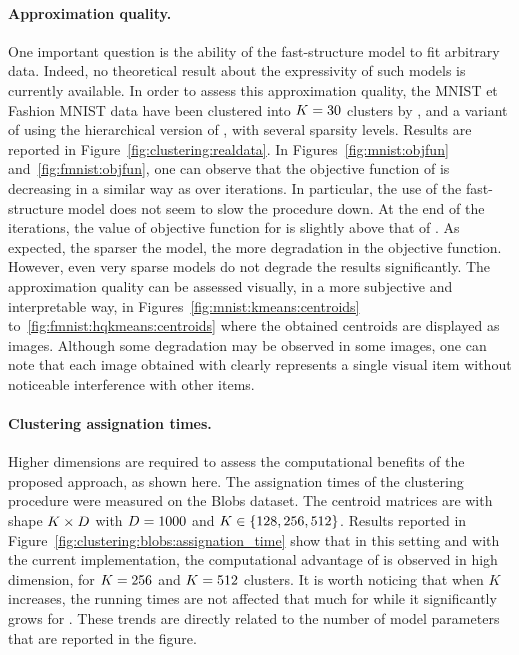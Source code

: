 \paragraph{Approximation quality.} One important question is the ability of the fast-structure model to fit arbitrary data.
Indeed, no theoretical result about the expressivity of such models is currently available.
In order to assess this approximation quality, the MNIST et Fashion MNIST data have been clustered into $K=30$ clusters by \kmeans, \qkmeans and a variant of \qkmeans using the hierarchical version of \palm, with several sparsity levels.
Results are reported in Figure~\ref{fig:clustering:realdata}.
In Figures~\ref{fig:mnist:objfun} and~\ref{fig:fmnist:objfun}, one can observe that the objective function of \qkmeans is decreasing in a similar way as \kmeans over iterations.
In particular, the use of the fast-structure model does not seem to slow the procedure down.
At the end of the iterations, the value of objective function for \qkmeans is slightly above that of \kmeans.
As expected, the sparser the model, the more degradation in the objective function.
However, even very sparse models do not degrade the results significantly.
The approximation quality can be assessed visually, in a more subjective and interpretable way, in Figures~\ref{fig:mnist:kmeans:centroids} to~\ref{fig:fmnist:hqkmeans:centroids} where the obtained centroids are displayed as images.
Although some degradation may be observed in some images, one can note that each image obtained with \qkmeans clearly represents a single visual item without noticeable interference with other items.

\paragraph{Clustering assignation times.}
Higher dimensions are required to assess the computational benefits of the proposed approach, as shown here.
The assignation times of the clustering procedure were measured on the Blobs dataset.
The centroid matrices are with shape $K \times D$ with $D=1000$  and $K\in\left \lbrace 128, 256, 512\right \rbrace$.
Results reported in Figure~\ref{fig:clustering:blobs:assignation_time} show that in this setting and with the current implementation, the computational advantage of \qkmeans is observed in high dimension, for $K=256$ and $K=512$ clusters. It is worth noticing that when $K$ increases, the running times are not affected that much for \qkmeans while it significantly grows for \kmeans. These trends are directly related to the number of model parameters that are reported in the figure.

